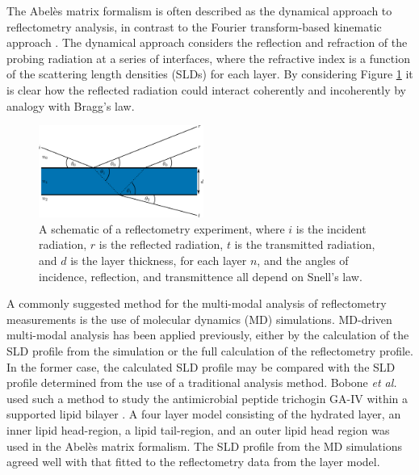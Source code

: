 \documentclass[amsmath,amssymb,twocolumn,superscriptaddress]{revtex4-1}
\begin{document}
The Abel\`{e}s matrix formalism is often described as the dynamical approach
to reflectometry analysis, in contrast to the Fourier transform-based
kinematic approach \cite{crowley_use_1991,lu_analysis_1996}.
The dynamical approach considers the reflection and refraction of the probing
radiation at a series of interfaces, where the refractive index is a
function of the scattering length densities (SLDs) for each layer.
By considering Figure \ref{fig:dyn} it is clear how the reflected radiation
could interact coherently and incoherently by analogy with Bragg's law.
%
\begin{figure}[h]
\centering
  \includegraphics[width=0.48\textwidth]{reflrefr}
  \caption{A schematic of a reflectometry experiment, where $i$ is the
  incident radiation, $r$ is the reflected radiation, $t$ is the transmitted
  radiation, and $d$ is the layer thickness, for each layer $n$, and the
  angles of incidence, reflection, and transmittence all depend on Snell's
  law.}
  \label{fig:dyn}
\end{figure}
%

A commonly suggested method for the multi-modal analysis of reflectometry
measurements is the use of molecular dynamics (MD) simulations.
MD-driven multi-modal analysis has been applied previously, either by the
calculation of the SLD profile from the simulation or the full calculation
of the reflectometry profile.
In the former case, the calculated SLD profile may be compared with the SLD
profile determined from the use of a traditional analysis method.
Bobone \emph{et al.} used such a method to study the antimicrobial peptide
trichogin GA-IV within a supported lipid bilayer \cite{bobone_membrane_2013}.
A four layer model consisting of the hydrated  layer, an inner lipid
head-region, a lipid tail-region, and an outer lipid head region was used in
the Abel\`{e}s matrix formalism.
The SLD profile from the MD simulations agreed well with that fitted to the
reflectometry data from the layer model.
\end{document}
